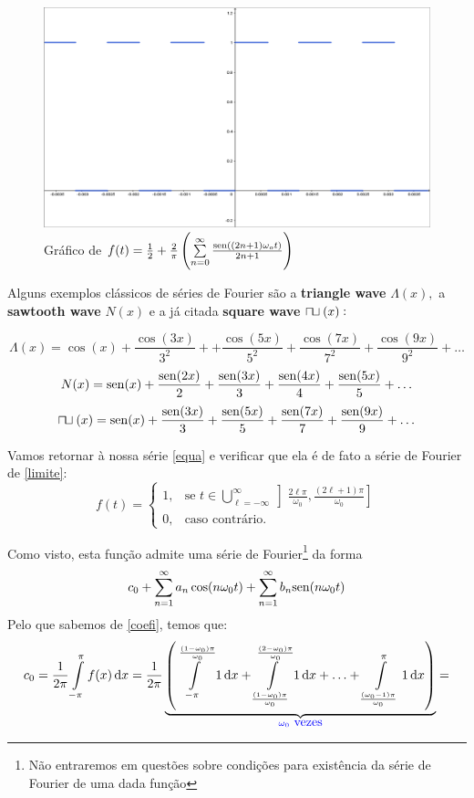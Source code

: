 \documentclass[11pt,twoside,a4paper]{book}
\begin{document}
\begin{figure}[!ht]
    \centering
    \includegraphics[width=.95\textwidth]{figuras/grafioflim.png}
    \caption{Gráfico de $f(t) =\frac{1}{2} + \frac{2}{\pi} \left( \sum\limits_{n = 0}^\infty \frac{{\rm sen}((2n+1) \omega_o t)}{2n+1} \right)  $}
    \label{figugraf}
\end{figure}
\newpage




Alguns exemplos clássicos de séries de Fourier são a \textbf{triangle wave} $\Lambda (x),$ a \textbf{sawtooth wave} $N(x)$ e a já citada \textbf{square wave} $\sqcap\ \hspace{-7pt}\sqcup (x):$

\[
\Lambda (x) = \cos(x) + \frac{\cos(3x)}{3^2} + + \frac{\cos(5x)}{5^2} + \frac{\cos(7x)}{7^2} + \frac{\cos(9x)}{9^2} + \ldots \]
\[
N(x) = {\rm sen}(x) + \frac{{\rm sen}(2x)}{2} + \frac{{\rm sen}(3x)}{3} + \frac{{\rm sen}(4x)}{4} + \frac{{\rm sen}(5x)}{5} + \ldots
\]
\[
\sqcap\ \hspace{-7pt}\sqcup (x) = {\rm sen}(x) + \frac{{\rm sen}(3x)}{3} + \frac{{\rm sen}(5x)}{5} + \frac{{\rm sen}(7x)}{7} + \frac{{\rm sen}(9x)}{9} + \ldots
\]


Vamos retornar à nossa série \ref{equa} e verificar que ela é de fato a série de Fourier de \ref{limite}:
\begin{equation}
f(t) = \left\{\begin{array}{lc}
1, & \mbox{se } t \in \bigcup\limits_{\ell =-\infty}^\infty \left] \frac{2 \ell \pi}{\omega_0}, \frac{(2 \ell + 1) \pi}{\omega_0} \right] \\
0, & \mbox{caso contrário.} 
\end{array} \right.
\end{equation}

Como visto, esta função admite uma série de Fourier\footnote{Não entraremos em questões sobre condições para existência da série de Fourier de uma dada função} da forma
\[
 c_0 + \sum\limits_{n = 1}^\infty a_n \cos(n \omega_0 t) + \sum\limits_{n = 1}^\infty b_n {\rm sen}(n \omega_0 t) 
\]
Pelo que sabemos de \ref{coefi}, temos que:
\[
c_0 =  \frac{1}{2 \pi} \int\limits_{-\pi}^\pi f(x) \dif {x} = \frac{1}{2 \pi}  \underbrace{\left(\int\limits_{-\pi}^{\frac{(1 - \omega_0) \pi}{\omega_0}} 1 \dif {x} + \int\limits_{\frac{(1 - \omega_0) \pi}{\omega_0}}^{\frac{(2 - \omega_0) \pi}{\omega_0}} 1 \dif {x} + \ldots + \int\limits_{\frac{(\omega_0 - 1) \pi}{\omega_0}}^{\pi} 1 \dif {x} \right)}_{\textcolor{blue}{\omega_0 \ \mbox{vezes} } }   = \]
\end{document}
